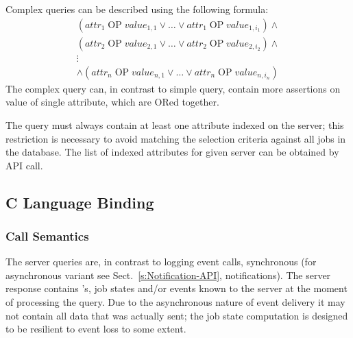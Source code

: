 Complex queries can be described using the following formula:
\begin{multline*}
(\textit{attr}_1 \mathop{\textrm{ OP }} \textit{value}_{1,1} \vee \dots \vee
\textit{attr}_1 \mathop{\textrm{ OP }} \textit{value}_{1,i_1}) \wedge \\
(\textit{attr}_2 \mathop{\textrm{ OP }} \textit{value}_{2,1} \vee \dots \vee
\textit{attr}_2 \mathop{\textrm{ OP }} \textit{value}_{2,i_2}) \wedge \\
\vdots \\
\wedge (\textit{attr}_n \mathop{\textrm{ OP }} \textit{value}_{n,1} \vee \dots \vee
\textit{attr}_n \mathop{\textrm{ OP }} \textit{value}_{n,i_n})
\end{multline*}
The complex query can, in contrast to simple query, contain more
assertions on value of single attribute, which are ORed together.

%
The query must always contain at least one attribute indexed
on the \LB server; this restriction is necessary to avoid matching the
selection criteria against all jobs in the \LB database. The list of
indexed attributes for given \LB server can be obtained by \LB API
call.

\subsection{C Language Binding}

\subsubsection{Call Semantics}
The \LB server queries are, in contrast to logging event calls,
synchronous (for asynchronous variant see Sect.~\ref{s:Notification-API},
notifications). The server response contains \jobid's, job states
and/or events known to the server at the moment of processing the
query. Due to the asynchronous nature of event delivery it may not
contain all data that was actually sent; the job state computation is
designed to be resilient to event loss to some extent.

